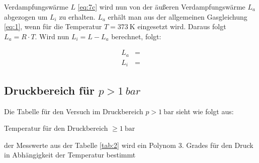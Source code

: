 \justifying Verdampfungswärme $L$ \eqref{eq:7c} wird nun von der äußeren Verdampfungswärme $L_a$ abgezogen um $L_i$ zu 
erhalten. $L_a$ erhält man aus der allgemeinen Gasgleichung \eqref{eq:1}, wenn für die Temperatur $T = \SI{373}{\kelvin}$ eingesetzt wird. 
Daraus folgt $L_a = R \cdot T$. Wird nun $L_i = L - L_a$ berechnet, folgt:

\begin{subequations} \label{eq:8}
\begin{align}
    L_a &= \text{} \label{eq:8a}\\
    L_i &= \text{} \label{eq:8b}
\end{align}
\end{subequations}

\subsection{Druckbereich für $p > \SI{1}{bar}$}

Die Tabelle für den Versuch im Druckbereich $p> \SI{1}{\bar} $ sieht wie folgt aus:

\begin{table}[H]
    \centering
    
    \caption{Temperatur für den Druckbereich $\geq \SI{1}{\bar}$}
    \label{tab:2}
\end{table}

\justifying der Messwerte aus der Tabelle \ref{tab:2} wird ein Polynom
3. Grades für den Druck in Abhängigkeit der Temperatur bestimmt

